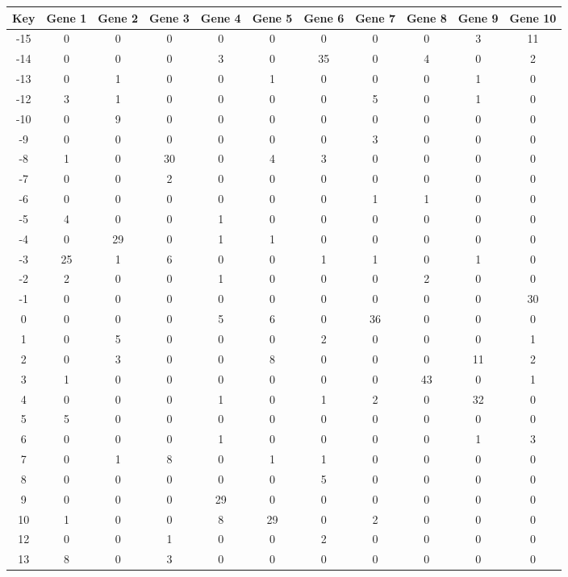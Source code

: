 \begin{tabular}{|c|c|c|c|c|c|c|c|c|c|c|}
\hline
Key & Gene 1 & Gene 2 & Gene 3 & Gene 4 & Gene 5 & Gene 6 & Gene 7 & Gene 8 & Gene 9 & Gene 10 \\
\hline
-15 & 0 & 0 & 0 & 0 & 0 & 0 & 0 & 0 & 3 & 11 \\
-14 & 0 & 0 & 0 & 3 & 0 & 35 & 0 & 4 & 0 & 2 \\
-13 & 0 & 1 & 0 & 0 & 1 & 0 & 0 & 0 & 1 & 0 \\
-12 & 3 & 1 & 0 & 0 & 0 & 0 & 5 & 0 & 1 & 0 \\
-10 & 0 & 9 & 0 & 0 & 0 & 0 & 0 & 0 & 0 & 0 \\
-9 & 0 & 0 & 0 & 0 & 0 & 0 & 3 & 0 & 0 & 0 \\
-8 & 1 & 0 & 30 & 0 & 4 & 3 & 0 & 0 & 0 & 0 \\
-7 & 0 & 0 & 2 & 0 & 0 & 0 & 0 & 0 & 0 & 0 \\
-6 & 0 & 0 & 0 & 0 & 0 & 0 & 1 & 1 & 0 & 0 \\
-5 & 4 & 0 & 0 & 1 & 0 & 0 & 0 & 0 & 0 & 0 \\
-4 & 0 & 29 & 0 & 1 & 1 & 0 & 0 & 0 & 0 & 0 \\
-3 & 25 & 1 & 6 & 0 & 0 & 1 & 1 & 0 & 1 & 0 \\
-2 & 2 & 0 & 0 & 1 & 0 & 0 & 0 & 2 & 0 & 0 \\
-1 & 0 & 0 & 0 & 0 & 0 & 0 & 0 & 0 & 0 & 30 \\
0 & 0 & 0 & 0 & 5 & 6 & 0 & 36 & 0 & 0 & 0 \\
1 & 0 & 5 & 0 & 0 & 0 & 2 & 0 & 0 & 0 & 1 \\
2 & 0 & 3 & 0 & 0 & 8 & 0 & 0 & 0 & 11 & 2 \\
3 & 1 & 0 & 0 & 0 & 0 & 0 & 0 & 43 & 0 & 1 \\
4 & 0 & 0 & 0 & 1 & 0 & 1 & 2 & 0 & 32 & 0 \\
5 & 5 & 0 & 0 & 0 & 0 & 0 & 0 & 0 & 0 & 0 \\
6 & 0 & 0 & 0 & 1 & 0 & 0 & 0 & 0 & 1 & 3 \\
7 & 0 & 1 & 8 & 0 & 1 & 1 & 0 & 0 & 0 & 0 \\
8 & 0 & 0 & 0 & 0 & 0 & 5 & 0 & 0 & 0 & 0 \\
9 & 0 & 0 & 0 & 29 & 0 & 0 & 0 & 0 & 0 & 0 \\
10 & 1 & 0 & 0 & 8 & 29 & 0 & 2 & 0 & 0 & 0 \\
12 & 0 & 0 & 1 & 0 & 0 & 2 & 0 & 0 & 0 & 0 \\
13 & 8 & 0 & 3 & 0 & 0 & 0 & 0 & 0 & 0 & 0 \\
\hline
\end{tabular}